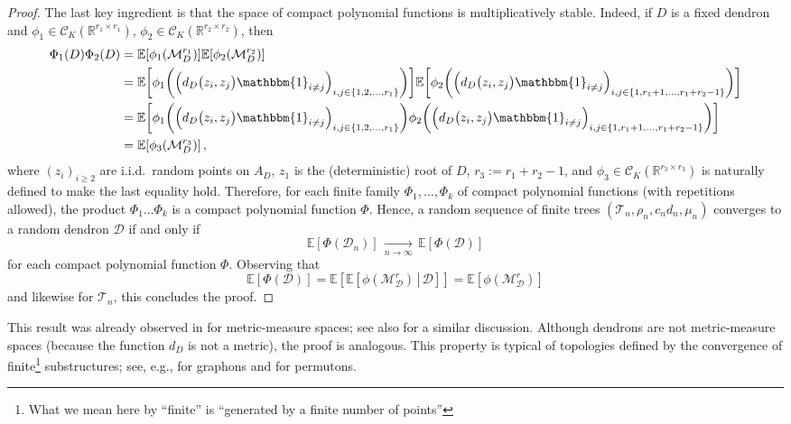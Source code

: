 \documentclass{article}
\theoremstyle{remark}
\newcommand{\bR}{\mathbb{R}}
\newcommand{\cv}[1]{\,\underset{#1}{\longrightarrow}\,}
\newcommand{\cT}{\mathcal{T}}
\newcommand{\cD}{\mathcal{D}}
\newcommand{\cM}{\mathcal{M}}
\newcommand{\cC}{\mathcal{C}}
\newcommand{\expec}[1]{\mathbb{E}{\left[#1\right]}}
\newcommand{\expecond}[2]{\mathbb{E}{\left[\left. #1 \,\right|\, #2 \right]}}
\newcommand{\One}[1]{\mathbbm{1}_{#1}}
\begin{document}
\begin{proof}
    The last key ingredient is that the space of compact polynomial functions is multiplicatively stable.
    Indeed, if $D$ is a fixed dendron and $\phi_1 \in \cC_K(\bR^{r_1\times r_1})$, $\phi_2 \in \cC_K(\bR^{r_2\times r_2})$, then
    \begin{align*}
        \Phi_1(D) \Phi_2(D)
        &= \expec{ \phi_1{\left( \cM_D^{r_1} \right)} } \expec{ \phi_2{\left( \cM_D^{r_2} \right)} }
        \\&= \expec{ \phi_1{\left(\left( d_D{\big( z_i, z_j \big)} \One{i\ne j} \right)_{i,j\in \{1, 2, \dots, r_1\}}\right)} } \expec{ \phi_2{\left(\left( d_D{\big( z_i, z_j \big)} \One{i\ne j} \right)_{i,j\in \{1, r_1+1, \dots, r_1+r_2-1\}}\right)} }
        \\&= \expec{ \phi_1{\left(\left( d_D{\big( z_i, z_j \big)} \One{i\ne j} \right)_{i,j\in \{1, 2, \dots, r_1\}}\right)} \phi_2{\left(\left( d_D{\big( z_i, z_j \big)} \One{i\ne j} \right)_{i,j\in \{1, r_1+1, \dots, r_1+r_2-1\}}\right)} }
        \\&= \expec{ \phi_3{\left( \cM_D^{r_3} \right)} }\,,
    \end{align*}
    where $(z_i)_{i\ge2}$ are i.i.d.~random points on $A_D$, $z_1$ is the (deterministic) root of $D$, $r_3 := r_1 + r_2 - 1$, and $\phi_3\in \cC_K(\bR^{r_3\times r_3})$ is naturally defined to make the last equality hold.
    Therefore, for each finite family $\Phi_1, \dots, \Phi_k$ of compact polynomial functions (with repetitions allowed), the product $\Phi_1 \dots \Phi_k$ is a compact polynomial function $\Phi$.
    Hence, a random sequence of finite trees $(\cT_n, \rho_n, c_n d_n, \mu_n)$ converges to a random dendron $\cD$ if and only if 
    \[
        \expec{ \Phi(\cD_n) }
        \cv{n\to\infty} 
        \expec{ \Phi(\cD) }
    \]
    for each compact polynomial function $\Phi$.
    Observing that 
    \[
        \expec{ \Phi(\cD) }
        = \expec{ \expecond{ \phi{\left( \cM_\cD^r \right)} }{\cD} }
        = \expec{ \phi{\left( \cM_\cD^r \right)} }
    \]
    and likewise for $\cT_n$, this concludes the proof.
\end{proof}

This result was already observed in \cite[Corollary~2.8]{Loehr_2013} for metric-measure spaces; see also \cite[Section~2]{Bassino_Bouvel_Feray_Gerin_Pierrot_2022} for a similar discussion.
Although dendrons are not metric-measure spaces (because the function $d_D$ is not a metric), the proof is analogous.
This property is typical of topologies defined by the convergence of finite\footnote{
    What we mean here by ``finite'' is ``generated by a finite number of points''
}
substructures;
see, e.g., \cite[Theorem~3.1]{diaconis2008graph} for graphons and \cite[Corollary~4.6]{Bassino_Bouvel_Feray_Gerin_Pierrot_2018} for permutons.
\end{document}
